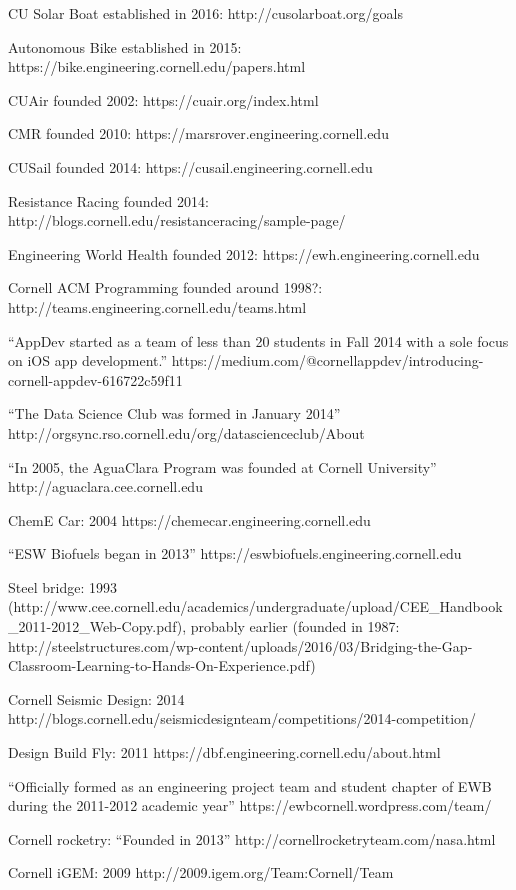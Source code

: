\documentclass[12pt]{article}
\begin{document}
CU Solar Boat established in 2016:
http://cusolarboat.org/goals

Autonomous Bike established in 2015:
https://bike.engineering.cornell.edu/papers.html

CUAir founded 2002:
https://cuair.org/index.html

CMR founded 2010:
https://marsrover.engineering.cornell.edu

CUSail founded 2014:
https://cusail.engineering.cornell.edu

Resistance Racing founded 2014:
http://blogs.cornell.edu/resistanceracing/sample-page/

Engineering World Health founded 2012:
https://ewh.engineering.cornell.edu

Cornell ACM Programming founded around 1998?:
http://teams.engineering.cornell.edu/teams.html

``AppDev started as a team of less than 20 students in Fall 2014 with a sole focus on iOS app development.''
https://medium.com/@cornellappdev/introducing-cornell-appdev-616722c59f11

``The Data Science Club was formed in January 2014''
http://orgsync.rso.cornell.edu/org/datascienceclub/About

``In 2005, the AguaClara Program was founded at Cornell University''
http://aguaclara.cee.cornell.edu

ChemE Car: 2004
https://chemecar.engineering.cornell.edu

``ESW Biofuels began in 2013''
https://eswbiofuels.engineering.cornell.edu

Steel bridge: 1993 (http://www.cee.cornell.edu/academics/undergraduate/upload/CEE_Handbook_2011-2012_Web-Copy.pdf), probably earlier (founded in 1987: http://steelstructures.com/wp-content/uploads/2016/03/Bridging-the-Gap-Classroom-Learning-to-Hands-On-Experience.pdf)

Cornell Seismic Design: 2014
http://blogs.cornell.edu/seismicdesignteam/competitions/2014-competition/

Design Build Fly: 2011
https://dbf.engineering.cornell.edu/about.html

``Officially formed as an engineering project team and student chapter of EWB during the 2011-2012 academic year''
https://ewbcornell.wordpress.com/team/

Cornell rocketry: ``Founded in 2013''
http://cornellrocketryteam.com/nasa.html

Cornell iGEM: 2009
http://2009.igem.org/Team:Cornell/Team
\end{document}
